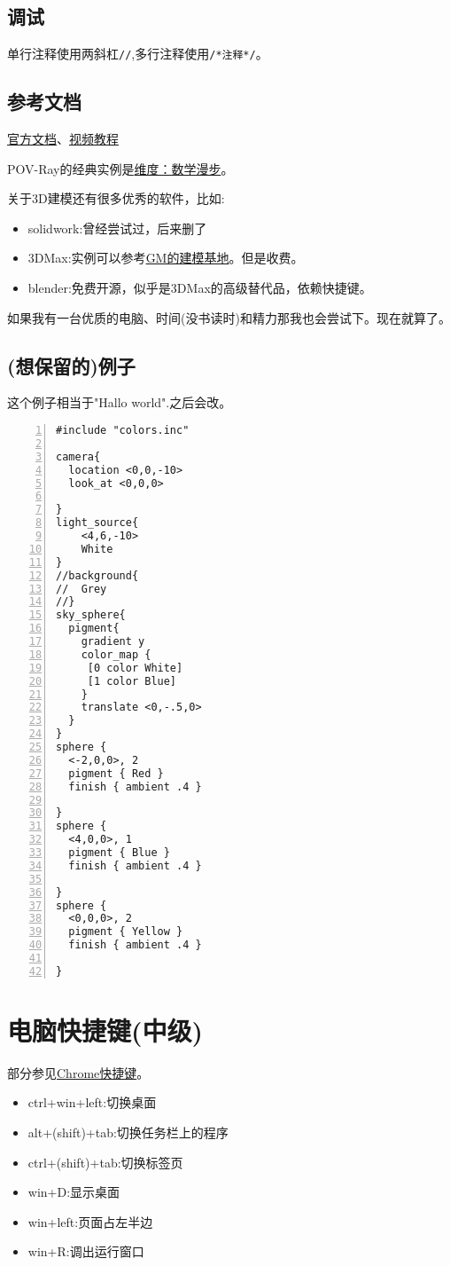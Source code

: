 \documentclass[11pt]{amsart}
\begin{document}
\subsection{调试}
单行注释使用两斜杠\lstinline|//|,多行注释使用\lstinline|/*注释*/|。
\subsection{参考文档}
\href{http://www.povray.org/documentation/3.7.0/t2_0.html}{官方文档}、\href{https://www.bilibili.com/video/BV1S4411e7AD}{视频教程}

POV-Ray的经典实例是\href{http://www.dimensions-math.org/Dim_ZH_si.htm}{维度：数学漫步}。

关于3D建模还有很多优秀的软件，比如:
\begin{itemize}
\item solidwork:曾经尝试过，后来删了
\item 3DMax:实例可以参考\href{https://www.bilibili.com/video/BV1hy4y1k7k4}{GM的建模基地}。但是收费。
\item blender:免费开源，似乎是3DMax的高级替代品，依赖快捷键。
\end{itemize}
如果我有一台优质的电脑、时间(没书读时)和精力那我也会尝试下。现在就算了。
\subsection{(想保留的)例子}

这个例子相当于"Hallo world".之后会改。
\begin{lstlisting}[numbers=left,numberstyle=\tiny,numbersep=10pt]
#include "colors.inc"

camera{
  location <0,0,-10>
  look_at <0,0,0>

} 
light_source{
    <4,6,-10>
    White
}   
//background{
//  Grey
//}
sky_sphere{
  pigment{
    gradient y
    color_map {
     [0 color White]
     [1 color Blue]
    } 
    translate <0,-.5,0>
  }
}       
sphere {
  <-2,0,0>, 2
  pigment { Red } 
  finish { ambient .4 }

}      
sphere {
  <4,0,0>, 1
  pigment { Blue } 
  finish { ambient .4 }

}    
sphere {
  <0,0,0>, 2
  pigment { Yellow } 
  finish { ambient .4 }

}
\end{lstlisting}
\section{电脑快捷键(中级)}
部分参见\href{https://zhuanlan.zhihu.com/p/42281412}{Chrome快捷键}。
\begin{itemize}
	\item  ctrl+win+left:切换桌面
	\item  alt+(shift)+tab:切换任务栏上的程序
	\item  ctrl+(shift)+tab:切换标签页
	\item  win+D:显示桌面
	\item  win+left:页面占左半边
	\item  win+R:调出运行窗口
\end{itemize} 
\end{document}
